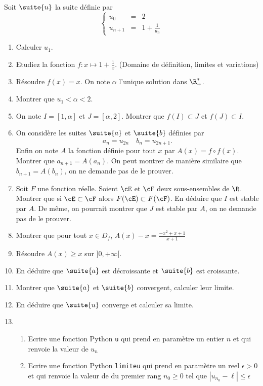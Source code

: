 




\begin{exercice} 
Soit $\suite{u}$ la suite définie par 
$$\left\{ 
\begin{array}{ccl}
u_0&=&2\\
u_{n+1} &=&1 +\frac{1}{u_n}
\end{array}
\right.$$

\begin{enumerate}
\item Calculer $u_1$.
\item Etudiez la fonction $f: x\mapsto 1+\frac{1}{x}$. (Domaine de définition, limites et variations) 
\item Résoudre $f(x)=x$. On note $\alpha$ l'unique solution dans $\R^*_+$. 
\item Montrer que $u_1<\alpha <2$.
\item On note $I=[1,\alpha]$ et $J=[\alpha,2]$. Montrer que $f(I)\subset J$ et $f(J)\subset I$.
\item On considère les suites $\suite{a}$ et  $\suite{b}$ définies par 
$$a_n=u_{2n} \quad b_n =u_{2n+1}.$$
Enfin on note $A$ la fonction définie pour tout $x$ par $A(x)=f\circ f(x)$.
 Montrer que $a_{n+1} =A (a_n)$. On peut montrer de manière similaire que 
 $b_{n+1} =A(b_n) $, on ne demande pas de le prouver. 
 \item Soit $F$ une fonction réelle. Soient $\cE $ et $\cF$ deux sous-ensembles de $\R$. Montrer que si $\cE\subset \cF$ alors $F(\cE)\subset F(\cF)$. En déduire que  $I$ est stable par $A$. De même, on pourrait montrer que $J$ est stable par $A$, on ne demande pas de le prouver. 
\item Montrer que pour tout $x\in D_f$, $A(x)-x =\frac{-x^2+x+1}{x+1}$ 
\item Résoudre $A(x)\geq x$ sur $]0,+\infty[$. 
\item  En déduire que $\suite{a}$ est décroissante et $\suite{b}$ est croissante. 
\item Montrer que $\suite{a}$ et $\suite{b}$ convergent, calculer leur limite. 
\item En déduire que $\suite{u}$ converge et calculer sa limite. 
\item \begin{enumerate}
\item Ecrire une fonction Python \texttt{u} qui prend en paramètre un entier $n$ et qui renvoie la valeur de $u_n$
\item Ecrire une fonction Python \texttt{limiteu} qui prend en paramètre un reel $\epsilon>0$ et  qui renvoie la valeur de du premier rang $n_0\geq 0$ tel que $|u_{n_0} -\ell|\leq \epsilon$ 
\end{enumerate}

\end{enumerate}

\end{exercice}


